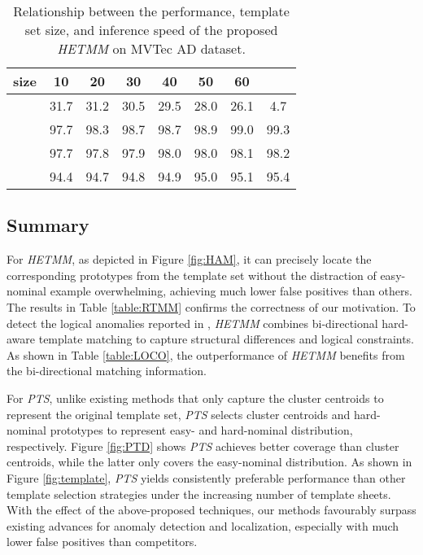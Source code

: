 \documentclass[default,iicol]{sn-jnl}\usepackage[algo2e,ruled,linesnumbered]{algorithm2e}
\theoremstyle{thmstyleone}\newtheorem{theorem}{Theorem}\newtheorem{proposition}[theorem]{Proposition}
\theoremstyle{thmstyletwo}\newtheorem{example}{Example}\newtheorem{remark}{Remark}
\theoremstyle{thmstylethree}\newtheorem{definition}{Definition}
\begin{document}
\begin{table}[!t]
    \setlength{\tabcolsep}{1.8mm}
    \caption{
        Relationship between the performance, template set size, and inference speed of the proposed \textit{HETMM} on MVTec AD dataset.
    }
    \centering
    \footnotesize
    \label{table:Templates}
    \begin{tabular}{c|ccccccc}
        \hline
        size  &10   &20   &30   &40   &50   &60   & \\\hline
                      &31.7 &31.2 &30.5 &29.5 &28.0 &26.1 &4.7   \\
          &97.7 &98.3 &98.7 &98.7 &98.9 &99.0 &99.3  \\
          &97.7 &97.8 &97.9 &98.0 &98.0 &98.1 &98.2  \\
              &94.4 &94.7 &94.8 &94.9 &95.0 &95.1 &95.4  \\\hline
\end{tabular}
\end{table}

\subsection{Summary}
For \textit{HETMM}, as depicted in Figure \ref{fig:HAM}, it can precisely locate the corresponding prototypes from the template set without the distraction of easy-nominal example overwhelming, achieving much lower false positives than others.
The results in Table \ref{table:RTMM} confirms the correctness of our motivation.
To detect the logical anomalies reported in \cite{MVTECLOCO}, \textit{HETMM} combines bi-directional hard-aware template matching to capture structural differences and logical constraints.
As shown in Table \ref{table:LOCO}, the outperformance of \textit{HETMM} benefits from the bi-directional matching information.

For \textit{PTS}, unlike existing methods that only capture the cluster centroids to represent the original template set, \textit{PTS} selects cluster centroids and hard-nominal prototypes to represent easy- and hard-nominal distribution, respectively.
Figure \ref{fig:PTD} shows \textit{PTS} achieves better coverage than cluster centroids, while the latter only covers the easy-nominal distribution.
As shown in Figure \ref{fig:template}, \textit{PTS} yields consistently preferable performance than other template selection strategies under the increasing number of template sheets.
With the effect of the above-proposed techniques, our methods favourably surpass existing advances for anomaly detection and localization, especially with much lower false positives than competitors.
\end{document}
